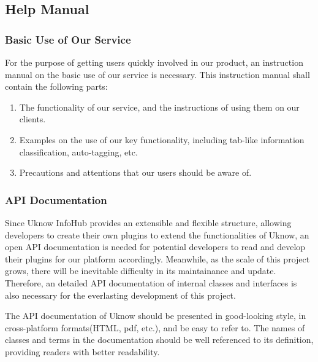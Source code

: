 \subsection{Help Manual}

\subsubsection{Basic Use of Our Service}

For the purpose of getting users quickly involved in our product, an
instruction manual on the basic use of our service is necessary. This
instruction manual shall contain the following parts:

\begin{enumerate}
\def\labelenumi{\arabic{enumi}.}
\item
  The functionality of our service, and the instructions of using them
  on our clients.
\item
  Examples on the use of our key functionality, including tab-like
  information classification, auto-tagging, etc.
\item
  Precautions and attentions that our users should be aware of.
\end{enumerate}

\subsubsection{API Documentation}

Since Uknow InfoHub provides an extensible and flexible structure,
allowing developers to create their own plugins to extend the
functionalities of Uknow, an open API documentation is needed for
potential developers to read and develop their plugins for our platform
accordingly. Meanwhile, as the scale of this project grows, there will
be inevitable difficulty in its maintainance and update. Therefore, an
detailed API documentation of internal classes and interfaces is also
necessary for the everlasting development of this project.

The API documentation of Uknow should be presented in good-looking
style, in cross-platform formats(HTML, pdf, etc.), and be easy to refer
to. The names of classes and terms in the documentation should be well
referenced to its definition, providing readers with better readability.
